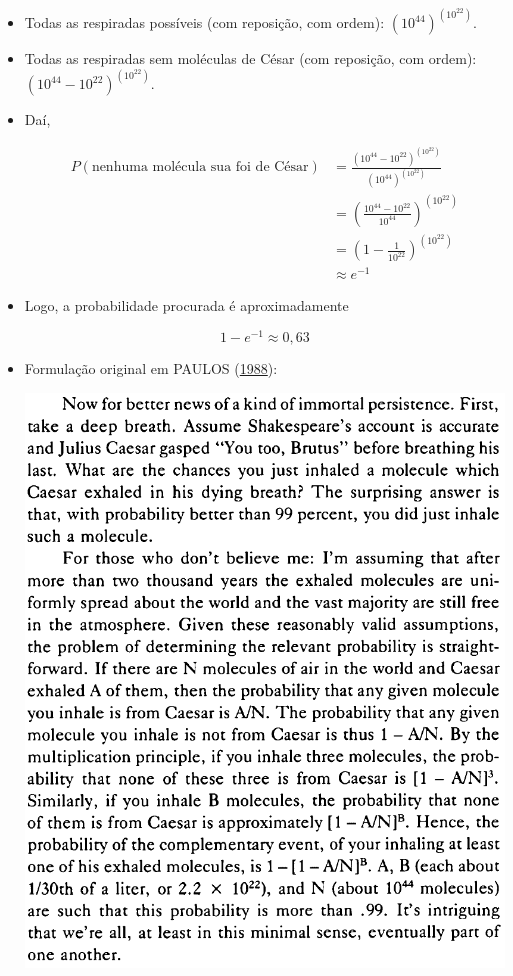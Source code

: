 \documentclass[
  11pt]{report}
\begin{document}
\begin{itemize}
\item
  Todas as respiradas possíveis (com reposição, com ordem): $\left( 10^{44} \right)^{\left(10^{22} \right)}$.
\item
  Todas as respiradas sem moléculas de César (com reposição, com ordem): $\left( 10^{44} - 10^{22} \right)^{\left(10^{22} \right)}$.
\item
  Daí,

  \[
  \begin{aligned}
  P(\text{nenhuma molécula sua foi de César}) 
  &=
  \frac{\left( 10^{44} - 10^{22} \right)^{\left(10^{22} \right)}}
  {\left( 10^{44} \right)^{\left(10^{22} \right)}}
  \\
  &= 
  \left( \frac{10^{44} - 10^{22}}{10^{44}} \right)^{(10^{22})}
  \\
  &=
  \left( 1 - \frac{1}{10^{22}} \right)^{(10^{{22}})}
  \\
  &\approx e^{-1}
  \end{aligned}
  \]
\item
  Logo, a probabilidade procurada é aproximadamente

  \[
  1 - e^{-1} \approx 0{,}63
  \]
\item
  Formulação original em PAULOS (\protect\hyperlink{ref-paulos-1988-innum}{1988}):

  \begin{center}\includegraphics[width=0.8\linewidth]{images/caesar} \end{center}
\end{itemize}
\end{document}
